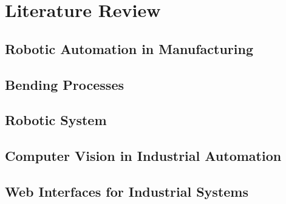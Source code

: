 \chapter{Literature Review}

\setcounter{section}{0}
\setcounter{subsection}{0}
\section{Robotic Automation in Manufacturing}

\section{Bending Processes}

\section{Robotic System}

\section{Computer Vision in Industrial Automation}

\section{Web Interfaces for Industrial Systems}